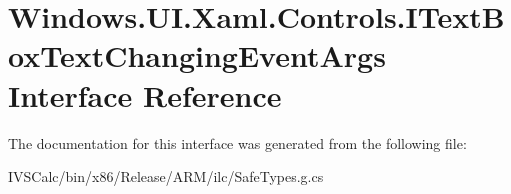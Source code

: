 \hypertarget{interface_windows_1_1_u_i_1_1_xaml_1_1_controls_1_1_i_text_box_text_changing_event_args}{}\section{Windows.\+U\+I.\+Xaml.\+Controls.\+I\+Text\+Box\+Text\+Changing\+Event\+Args Interface Reference}
\label{interface_windows_1_1_u_i_1_1_xaml_1_1_controls_1_1_i_text_box_text_changing_event_args}


The documentation for this interface was generated from the following file\+:\begin{DoxyCompactItemize}
\item 
I\+V\+S\+Calc/bin/x86/\+Release/\+A\+R\+M/ilc/Safe\+Types.\+g.\+cs\end{DoxyCompactItemize}
